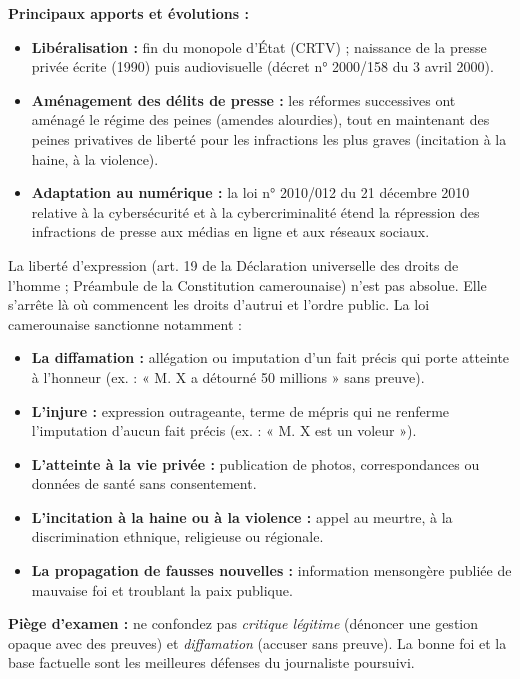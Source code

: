 \documentclass[11pt]{article}
\begin{document}
\textbf{Principaux apports et évolutions :}
\begin{itemize}
    \item \textbf{Libéralisation :} fin du monopole d'État (CRTV) ; naissance de la presse privée écrite (1990) puis audiovisuelle (décret n° 2000/158 du 3 avril 2000).
    \item \textbf{Aménagement des délits de presse :} les réformes successives ont aménagé le régime des peines (amendes alourdies), tout en maintenant des peines privatives de liberté pour les infractions les plus graves (incitation à la haine, à la violence).
    \item \textbf{Adaptation au numérique :} la loi n° 2010/012 du 21 décembre 2010 relative à la cybersécurité et à la cybercriminalité étend la répression des infractions de presse aux médias en ligne et aux réseaux sociaux.
\end{itemize}

\begin{attention}
La liberté d'expression (art. 19 de la Déclaration universelle des droits de l'homme ; Préambule de la Constitution camerounaise) n'est pas absolue. Elle s'arrête là où commencent les droits d'autrui et l'ordre public. La loi camerounaise sanctionne notamment :
\begin{itemize}
    \item \textbf{La diffamation :} allégation ou imputation d'un fait précis qui porte atteinte à l'honneur (ex. : « M. X a détourné 50 millions » sans preuve).
    \item \textbf{L'injure :} expression outrageante, terme de mépris qui ne renferme l'imputation d'aucun fait précis (ex. : « M. X est un voleur »).
    \item \textbf{L'atteinte à la vie privée :} publication de photos, correspondances ou données de santé sans consentement.
    \item \textbf{L'incitation à la haine ou à la violence :} appel au meurtre, à la discrimination ethnique, religieuse ou régionale.
    \item \textbf{La propagation de fausses nouvelles :} information mensongère publiée de mauvaise foi et troublant la paix publique.
\end{itemize}
\textbf{Piège d'examen :} ne confondez pas \emph{critique légitime} (dénoncer une gestion opaque avec des preuves) et \emph{diffamation} (accuser sans preuve). La bonne foi et la base factuelle sont les meilleures défenses du journaliste poursuivi.
\end{attention}
\end{document}
